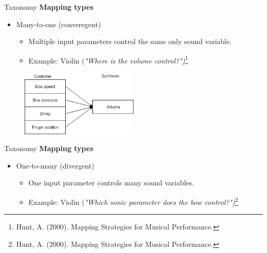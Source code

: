 \documentclass{beamer}
\begin{document}
\begin{frame}{Taxonomy}
    \textbf{Mapping types}\\
    \vspace{5mm}
    \begin{itemize}
        \item Many-to-one (converegent)
        \begin{itemize}
            \item Multiple input parameters control the same only sound variable.
            \item Example: Violin (\textit{"Where is the volume control?")}\footnote{Hunt, A. (2000). Mapping Strategies for Musical Performance.}
         \end{itemize}
    \end{itemize}
    \begin{figure}[h]
        \includegraphics[width=0.5\textwidth]{violin_mapping1.png}
    \end{figure}
\end{frame}

\begin{frame}{Taxonomy}
    \textbf{Mapping types}\\
    \vspace{5mm}
    \begin{itemize}
        \item One-to-many (divergent)
        \begin{itemize}
            \item One input parameter controls many sound variables.
            \item Example: Violin (\textit{"Which sonic parameter does the bow control?")}\footnote{Hunt, A. (2000). Mapping Strategies for Musical Performance.}
         \end{itemize}
    \end{itemize}
\end{frame}
\end{document}
